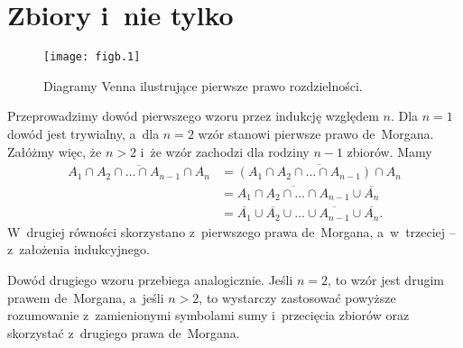 \chapter{Zbiory i~nie tylko}


\exercise %
\begin{figure}[ht]
	\begin{center}
		\texttt{[image: figb.1]}
	\end{center}
	\caption{Diagramy Venna ilustrujące pierwsze prawo rozdzielności.}
\end{figure}

\exercise %
Przeprowadzimy dowód pierwszego wzoru przez indukcję względem $n$. Dla $n=1$ dowód jest trywialny, a~dla $n=2$ wzór stanowi pierwsze prawo de~Morgana. Załóżmy więc, że $n>2$ i~że wzór zachodzi dla rodziny $n-1$ zbiorów. Mamy
\begin{align*}
	\overline{A_1\cap A_2\cap\dots\cap A_{n-1}\cap A_n} &= \overline{(A_1\cap A_2\cap\dots\cap A_{n-1})\cap A_n} \\
	&= \overline{A_1\cap A_2\cap\dots\cap A_{n-1}}\cup\overline{A_n} \\
	&= \overline{A_1}\cup\overline{A_2}\cup\dots\cup\overline{A_{n-1}}\cup\overline{A_n}.
\end{align*}
W~drugiej równości skorzystano z~pierwszego prawa de~Morgana, a~w~trzeciej -- z~założenia indukcyjnego.

Dowód drugiego wzoru przebiega analogicznie. Jeśli $n=2$, to wzór jest drugim prawem de~Morgana, a~jeśli $n>2$, to wystarczy zastosować powyższe rozumowanie z~zamienionymi symbolami sumy i~przecięcia zbiorów oraz skorzystać z~drugiego prawa de~Morgana.

